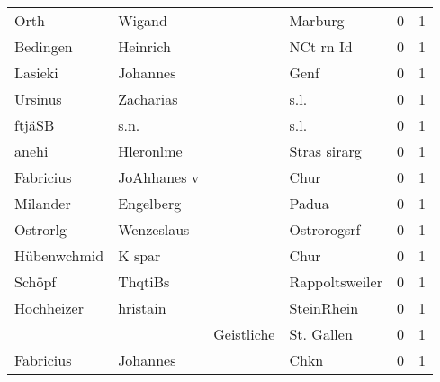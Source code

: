 \documentclass[10pt,a4paper,landscape]{article}
\begin{document}
\begin{longtable}{llllrr}
                     Orth &                             Wigand &             &                                     Marburg &          0 &         1 \\
                 Bedingen &                           Heinrich &             &                                   NCt rn Id &          0 &         1 \\
                  Lasieki &                           Johannes &             &                                        Genf &          0 &         1 \\
                  Ursinus &                          Zacharias &             &                                        s.l. &          0 &         1 \\
                   ftjäSB &                               s.n. &             &                                        s.l. &          0 &         1 \\
                    anehi &                          Hleronlme &             &                                Stras sirarg &          0 &         1 \\
                Fabricius &                        JoAhhanes v &             &                                        Chur &          0 &         1 \\
                 Milander &                          Engelberg &             &                                       Padua &          0 &         1 \\
                 Ostrorlg &                         Wenzeslaus &             &                                 Ostrorogsrf &          0 &         1 \\
              Hübenwchmid &                             K spar &             &                                        Chur &          0 &         1 \\
                   Schöpf &                            ThqtiBs &             &                              Rappoltsweiler &          0 &         1 \\
               Hochheizer &                           hristain &             &                                  SteinRhein &          0 &         1 \\
                          &                                    &  Geistliche &                                  St. Gallen &          0 &         1 \\
                Fabricius &                           Johannes &             &                                        Chkn &          0 &         1 \\

\end{longtable}
\end{document}
